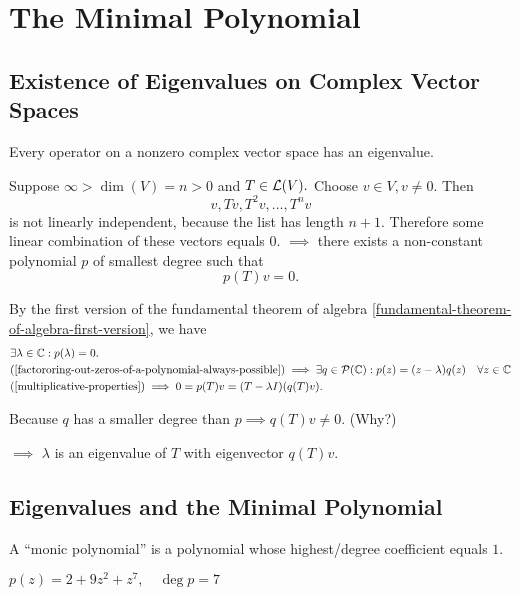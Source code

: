 \section{The Minimal Polynomial}
\subsection{Existence of Eigenvalues on Complex Vector Spaces}

\begin{thm} 
  \label{thm: existence of eigenvalues}
  Every operator on a \fd non\-zero complex vector space has an eigenvalue.
\end{thm}
\begin{prf}
  Suppose $\infty>\dim(V)=n>0$ and $T\in \mathcal{L}(V).$ Choose $v\in V, v\neq0$. Then 
  \begin{equation}
    v, Tv, T^2v, \dots, T^nv
  \end{equation} 
  is not linearly independent, 
  because the list has length $n+1$. Therefore some linear combination of these vectors equals $0$. 
  $\implies$ there exists a non-constant polynomial $p$ of smallest degree such that 
  \begin{equation}
    p(T)v = 0. 
  \end{equation}
  
  By the first version of the fundamental theorem of algebra \ref{fundamental-theorem-of-algebra-first-version}, we have 
  \begin{equation}
    \begin{aligned}
      &\exists \lambda \in \mathbb{C}: p(\lambda) = 0. \\  
      &\text{(\ref{factororing-out-zeros-of-a-polynomial-always-possible})}
      \implies \exists q \in \mathcal {P} (\mathbb{C}): p(z) = (z-\lambda)  q(z) \quad \forall z \in \mathbb{C} \\
      &\text{(\ref{multiplicative-properties})} \implies 0=p(T)v=(T-\lambda I) (q(T)v).
    \end{aligned} 
  \end{equation}
  
  Because $q$ has a smaller degree than $p \implies q(T)v \neq 0$. (Why?) 
  
  $\implies$ $\lambda$ is an eigenvalue of $T$ with eigenvector $q(T)v$.
\end{prf}

\subsection{Eigenvalues and the Minimal Polynomial}
\begin{mydef} 
  A ``monic polynomial'' is a polynomial whose highest\-/degree coefficient equals $1$.
\end{mydef}
\begin{example}
  $p(z)=2+9z^2+z^7, \quad \deg p = 7$
\end{example}

